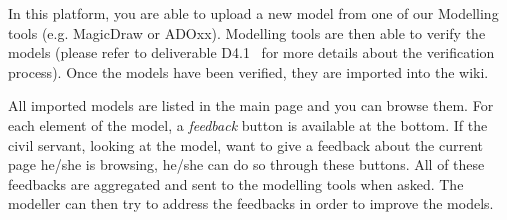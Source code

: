 \documentclass{learnpad}
\begin{document}
In this platform, you are able to upload a new model from one of our Modelling
tools (e.g. MagicDraw or ADOxx).  Modelling tools are then able to verify the 
models (please refer to deliverable D4.1~\cite{learnpad:D4.1} for more details 
about the verification process). Once the models have been verified, they are 
imported into the wiki.

All imported models are listed in the main page and you can browse them.  For
each element of the model, a \textit{feedback} button is available at the 
bottom. If the civil servant, looking at the model, want to give a feedback 
about the current page he/she is browsing, he/she can do so through these buttons.  All of 
these feedbacks are aggregated and sent to the modelling tools when asked.  The 
modeller can then try to address the feedbacks in order to improve the models.







 

\end{document}
